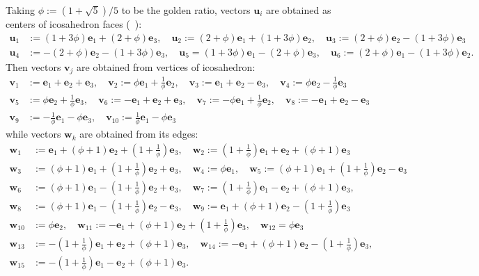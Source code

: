 \documentclass[11pt,a4paper]{amsart}
\theoremstyle{definition}
\newcommand{\1}{\mathds{1}}		            %
\newcommand{\ee}{\pmb{e}}                   %
\newcommand{\uu}{\pmb{u}}                   %
\newcommand{\vv}{\pmb{v}}                   %
\begin{document}
Taking $\phi:=(1+\sqrt{5})/5$ to be the golden ratio, vectors $\uu_i$ are obtained as centers of icosahedron faces (~\cite[Figure 11]{Olive2019}):
\begin{align*}
  \uu_1 & :=(1+3\phi)\ee_1+(2+\phi)\ee_3,\quad \uu_2:=(2+\phi)\ee_1+(1+3\phi)\ee_2,\quad \uu_3:=(2+\phi)\ee_2-(1+3\phi)\ee_3  \\
  \uu_4 & :=-(2+\phi)\ee_2-(1+3\phi)\ee_3,\quad \uu_5=(1+3\phi)\ee_1-(2+\phi)\ee_3,\quad \uu_6:=(2+\phi)\ee_1-(1+3\phi)\ee_2.
\end{align*}
Then vectors $\vv_j$ are obtained from vertices of icosahedron:
\begin{align*}
  \vv_1 & :=\ee_1+\ee_2+\ee_3,\quad \vv_2:=\phi\ee_1+\frac{1}{\phi}\ee_2,\quad \vv_3:=\ee_1+\ee_2-\ee_3,\quad \vv_4:=\phi\ee_2-\frac{1}{\phi}\ee_3    \\
  \vv_5 & :=\phi\ee_2+\frac{1}{\phi}\ee_3,\quad \vv_6:=-\ee_1+\ee_2+\ee_3,\quad \vv_7:=-\phi\ee_1+\frac{1}{\phi}\ee_2,\quad \vv_8:=-\ee_1+\ee_2-\ee_3 \\
  \vv_9 & :=-\frac{1}{\phi}\ee_1-\phi\ee_3,\quad \vv_{10}:=\frac{1}{\phi}\ee_1-\phi\ee_3
\end{align*}
while vectors $\pmb{w}_k$ are obtained from its edges:
\begin{align*}
  \pmb{w}_1    & :=\ee_1+(\phi+1)\ee_2+\left(1+\frac{1}{\phi}\right)\ee_3,\quad \pmb{w}_2:=\left(1+\frac{1}{\phi}\right)\ee_1+\ee_2+(\phi+1)\ee_3
  \\
  \pmb{w}_3    & :=(\phi+1)\ee_1+\left(1+\frac{1}{\phi}\right)\ee_2+\ee_3,\quad \pmb{w}_4:=\phi\ee_1,\quad \pmb{w}_5:=(\phi+1)\ee_1+\left(1+\frac{1}{\phi}\right)\ee_2-\ee_3 \\
  \pmb{w}_6    & :=(\phi+1)\ee_1-\left(1+\frac{1}{\phi}\right)\ee_2+\ee_3,\quad
  \pmb{w}_7:=\left(1+\frac{1}{\phi}\right)\ee_1-\ee_2+(\phi+1)\ee_3,\quad                                                                                                    \\
  \pmb{w}_8    & :=(\phi+1)\ee_1-\left(1+\frac{1}{\phi}\right)\ee_2-\ee_3,\quad
  \pmb{w}_9:=\ee_1+(\phi+1)\ee_2-\left(1+\frac{1}{\phi}\right)\ee_3                                                                                                          \\
  \pmb{w}_{10} & :=\phi\ee_2,\quad \pmb{w}_{11}:=-\ee_1+(\phi+1)\ee_2+\left(1+\frac{1}{\phi}\right)\ee_3, \quad
  \pmb{w}_{12}=\phi\ee_3                                                                                                                                                     \\
  \pmb{w}_{13} & :=-\left(1+\frac{1}{\phi}\right)\ee_1+\ee_2+(\phi+1)\ee_3,\quad
  \pmb{w}_{14}:=-\ee_1+(\phi+1)\ee_2-\left(1+\frac{1}{\phi}\right)\ee_3,                                                                                                     \\
  \pmb{w}_{15} & :=-\left(1+\frac{1}{\phi}\right)\ee_1-\ee_2+(\phi+1)\ee_3.
\end{align*}
\end{document}

